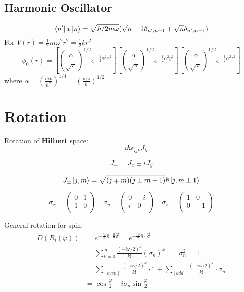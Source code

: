 \subsection{Harmonic Oscillator}
\[
    \bra{n'}x\ket{n}=\sqrt{\hbar/2m\omega}(\sqrt{n+1}\delta_{n',n+1}+\sqrt{n}\delta_{n',n-1})
    \]
For $V(r)=\frac{1}{2}m\omega^2r^2=\frac{1}{2}kr^2$
\[
    \phi_0(r)=[(\frac{\alpha}{\sqrt{\pi}})^{1/2}e^{-\frac{1}{2}\alpha^2x^2}]
    [(\frac{\alpha}{\sqrt{\pi}})^{1/2}e^{-\frac{1}{2}\alpha^2y^2}]
    [(\frac{\alpha}{\sqrt{\pi}})^{1/2}e^{-\frac{1}{2}\alpha^2z^2}]
    \]
where $\alpha=(\frac{mk}{\hbar^2})^{1/4}=(\frac{m\omega}{\hbar})^{1/2}$

\section{Rotation}
Rotation of \textbf{Hilbert} space:
\begin{equation}
    [J_i, J_j] = i\hbar\epsilon_{ijk}J_k
\end{equation}

\begin{equation}
    J_{\pm} = J_x \pm iJ_y
\end{equation}

\begin{equation}
    J_{\pm}\ket{j,m} = \sqrt{(j\mp m)(j\pm m+1)}\hbar\ket{j,m\pm 1}
\end{equation}

\begin{equation}
    \label{Pauli matrixes}
    \sigma_x = 
    \begin{pmatrix}
	0   &	1   \\
	1   &	0   \\
    \end{pmatrix}   \quad
    \sigma_y = 
    \begin{pmatrix}
	0   &	-i   \\
	i   &	0   \\
    \end{pmatrix}   \quad
    \sigma_z = 
    \begin{pmatrix}
	1   &	0   \\
	0   &	-1   \\
    \end{pmatrix}   
\end{equation}


General rotation for spin:
\begin{equation}
    \begin{aligned}
	D(R_i(\varphi)) &= e^{-\frac{i\varphi}{\hbar}\hat{n}\cdot\frac{\hbar}{2}\vec{\sigma}} = e^{-\frac{i\varphi}{2}\hat{n}\cdot\vec{\sigma}} \\
	&= \displaystyle \sum_{k=0}^{\infty}\frac{(-i\varphi/2)^k}{k!}(\sigma_n)^k   \qquad  \sigma_n^2=1    \\
	&= \displaystyle \sum_{[even]}\frac{(-i\varphi/2)^k}{k!}\cdot\mathds{1} + \displaystyle \sum_{[odd]}\frac{(-i\varphi/2)^k}{k!}\cdot\sigma_n \\
	&= \cos\frac{\varphi}{2} -i\sigma_n\sin\frac{\varphi}{2}
    \end{aligned}
\end{equation}

